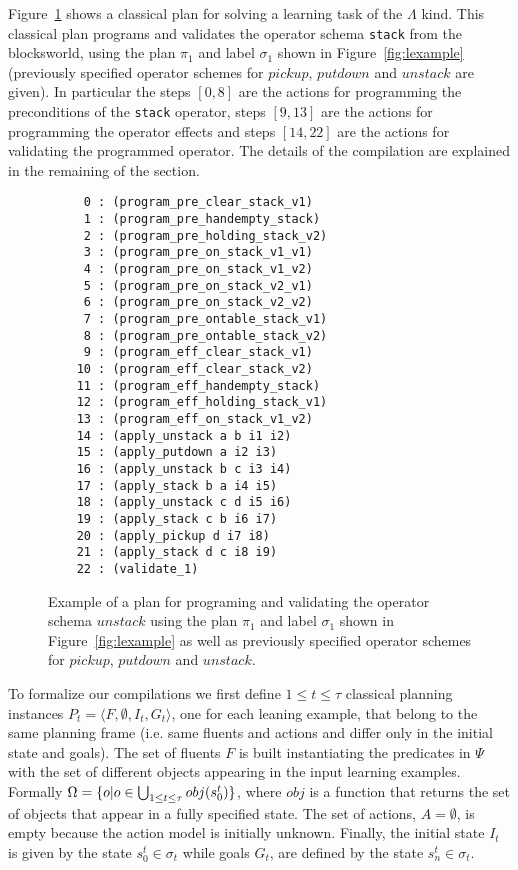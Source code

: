 \documentclass[letterpaper]{article} %
\newcommand{\tup}[1]{{\langle #1 \rangle}}
\begin{document}
Figure~\ref{fig:plan} shows a classical plan for solving a learning task of the $\Lambda$ kind. This classical plan programs and validates the operator schema {\tt\small stack} from the blocksworld, using the plan $\pi_1$ and label $\sigma_1$ shown in Figure~\ref{fig:lexample} (previously specified operator schemes for $pickup$, $putdown$ and $unstack$ are given). In particular the steps $[0,8]$ are the actions for programming the preconditions of the {\tt\small stack} operator, steps $[9,13]$ are the actions for programming the operator effects and steps $[14,22]$ are the actions for validating the programmed operator. The details of the compilation are explained in the remaining of the section.

\begin{figure}[hbt]
\begin{footnotesize}
\begin{verbatim}
     0 : (program_pre_clear_stack_v1)
     1 : (program_pre_handempty_stack)
     2 : (program_pre_holding_stack_v2)
     3 : (program_pre_on_stack_v1_v1)
     4 : (program_pre_on_stack_v1_v2)
     5 : (program_pre_on_stack_v2_v1)
     6 : (program_pre_on_stack_v2_v2)
     7 : (program_pre_ontable_stack_v1)
     8 : (program_pre_ontable_stack_v2)
     9 : (program_eff_clear_stack_v1)
    10 : (program_eff_clear_stack_v2)
    11 : (program_eff_handempty_stack)
    12 : (program_eff_holding_stack_v1)
    13 : (program_eff_on_stack_v1_v2)
    14 : (apply_unstack a b i1 i2)
    15 : (apply_putdown a i2 i3)
    16 : (apply_unstack b c i3 i4)
    17 : (apply_stack b a i4 i5)
    18 : (apply_unstack c d i5 i6)
    19 : (apply_stack c b i6 i7)
    20 : (apply_pickup d i7 i8)
    21 : (apply_stack d c i8 i9)
    22 : (validate_1)
\end{verbatim}
\end{footnotesize}
 \caption{\small Example of a plan for programing and validating the operator schema $unstack$ using the plan $\pi_1$ and label $\sigma_1$ shown in Figure~\ref{fig:lexample} as well as previously specified operator schemes for $pickup$, $putdown$ and $unstack$.}
\label{fig:plan}
\end{figure}

To formalize our compilations we first define {\small $1\leq t\leq \tau$} classical planning instances $P_t=\tup{F,\emptyset,I_t,G_t}$, one for each leaning example, that belong to the same planning frame (i.e. same fluents and actions and differ only in the initial state and goals). The set of fluents $F$ is built instantiating the predicates in $\Psi$ with the set of different objects appearing in the input learning examples. Formally $\Omega=\{o|o\in \bigcup_{\small 1\leq t\leq \tau} obj(s_0^t)\}$, where $obj$ is a function that returns the set of objects that appear in a fully specified state. The set of actions, $A=\emptyset$, is empty because the action model is initially unknown. Finally, the initial state $I_t$ is given by the state $s_0^t\in \sigma_t$ while goals $G_t$, are defined by the state $s_n^t\in \sigma_t$. 
\end{document}
